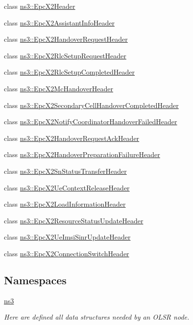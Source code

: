 \begin{DoxyCompactItemize}
\item 
class \hyperlink{classns3_1_1EpcX2Header}{ns3\+::\+Epc\+X2\+Header}
\item 
class \hyperlink{classns3_1_1EpcX2AssistantInfoHeader}{ns3\+::\+Epc\+X2\+Assistant\+Info\+Header}
\item 
class \hyperlink{classns3_1_1EpcX2HandoverRequestHeader}{ns3\+::\+Epc\+X2\+Handover\+Request\+Header}
\item 
class \hyperlink{classns3_1_1EpcX2RlcSetupRequestHeader}{ns3\+::\+Epc\+X2\+Rlc\+Setup\+Request\+Header}
\item 
class \hyperlink{classns3_1_1EpcX2RlcSetupCompletedHeader}{ns3\+::\+Epc\+X2\+Rlc\+Setup\+Completed\+Header}
\item 
class \hyperlink{classns3_1_1EpcX2McHandoverHeader}{ns3\+::\+Epc\+X2\+Mc\+Handover\+Header}
\item 
class \hyperlink{classns3_1_1EpcX2SecondaryCellHandoverCompletedHeader}{ns3\+::\+Epc\+X2\+Secondary\+Cell\+Handover\+Completed\+Header}
\item 
class \hyperlink{classns3_1_1EpcX2NotifyCoordinatorHandoverFailedHeader}{ns3\+::\+Epc\+X2\+Notify\+Coordinator\+Handover\+Failed\+Header}
\item 
class \hyperlink{classns3_1_1EpcX2HandoverRequestAckHeader}{ns3\+::\+Epc\+X2\+Handover\+Request\+Ack\+Header}
\item 
class \hyperlink{classns3_1_1EpcX2HandoverPreparationFailureHeader}{ns3\+::\+Epc\+X2\+Handover\+Preparation\+Failure\+Header}
\item 
class \hyperlink{classns3_1_1EpcX2SnStatusTransferHeader}{ns3\+::\+Epc\+X2\+Sn\+Status\+Transfer\+Header}
\item 
class \hyperlink{classns3_1_1EpcX2UeContextReleaseHeader}{ns3\+::\+Epc\+X2\+Ue\+Context\+Release\+Header}
\item 
class \hyperlink{classns3_1_1EpcX2LoadInformationHeader}{ns3\+::\+Epc\+X2\+Load\+Information\+Header}
\item 
class \hyperlink{classns3_1_1EpcX2ResourceStatusUpdateHeader}{ns3\+::\+Epc\+X2\+Resource\+Status\+Update\+Header}
\item 
class \hyperlink{classns3_1_1EpcX2UeImsiSinrUpdateHeader}{ns3\+::\+Epc\+X2\+Ue\+Imsi\+Sinr\+Update\+Header}
\item 
class \hyperlink{classns3_1_1EpcX2ConnectionSwitchHeader}{ns3\+::\+Epc\+X2\+Connection\+Switch\+Header}
\end{DoxyCompactItemize}
\subsection*{Namespaces}
\begin{DoxyCompactItemize}
\item 
 \hyperlink{namespacens3}{ns3}
\begin{DoxyCompactList}\small\item\em Here are defined all data structures needed by an O\+L\+SR node. \end{DoxyCompactList}\end{DoxyCompactItemize}
